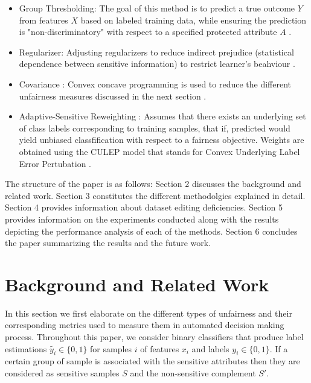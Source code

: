 \documentclass[runningheads]{llncs}
\begin{document}
\begin{itemize}
\item Group Thresholding: The goal of this method is to predict a true outcome $Y$ from features $X$ based on labeled training data, while ensuring the prediction is "non-discriminatory" with respect to a specified protected attribute $A$ \cite{hardt2016equality}.
\item Regularizer: Adjusting regularizers to reduce indirect prejudice (statistical dependence between sensitive information) to restrict learner's beahviour \cite{kamishima2012fairness}.
\item Covariance : Convex concave programming is used to reduce the different unfairness measures discussed in the next section \cite{zafar2017fairness} \cite{zafar2015fairness}.
\item Adaptive-Sensitive Reweighting : Assumes that there exists an underlying set of class labels corresponding to training samples, that if, predicted would yield unbiased classfification with respect to a fairness objective. Weights are obtained using the CULEP model that stands for Convex Underlying Label Error Pertubation \cite{krasanakis2018adaptive}.
\end{itemize} 
The structure of the paper is as follows: Section 2 discusses the background and related work. Section 3 constitutes the different methodolgies explained in detail. Section 4 provides information about dataset editing deficiencies. Section 5 provides information on the experiments conducted along with the results depicting the performance analysis of each of the methods. Section 6 concludes the paper summarizing the results and the future work.
\section{Background and Related Work}
In this section we first elaborate on the different types of unfairness  and their corresponding metrics used to measure them in automated decision making process. Throughout this paper, we consider binary classifiers that produce label estimations $\tilde{y_i} \in \{0,1\}$ for samples $i$ of features $x_i$ and labels $y_i \in \{0,1\}$. If a certain group of sample is associated with the sensitive attributes then they are considered as sensitive samples $S$ and the non-sensitive complement $S'$.
\end{document}
